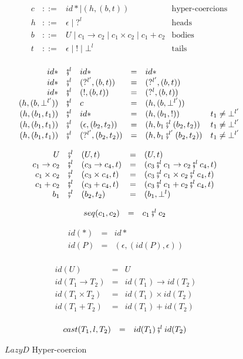 \documentclass[acmsmall,review,anonymous]{acmart}\settopmatter{printfolios=true,printccs=false,printacmref=false}
\newcommand{\stxrule}[3]{#1 & ::= & #3 & \text{#2}\\}
\newcommand{\funrule}[3]{#1 & = & #2 & #3\\}
\newcommand{\comprule}[4]{#1 & \fatsemi^l & #2 & = & #3 & #4 \\}
\newcommand{\plus}[0]{+}
\begin{document}
\begin{figure}
	\[ 
	\begin{array}{lclr}
	\stxrule{c}{hyper-coercions}{
		id* \mid{}
		( h , ( b , t ) )
	}
	\stxrule{h}{heads}{
		\epsilon \mid{}
		?^l
	}
	\stxrule{b}{bodies}{
		U \mid{}
		c_1 \rightarrow c_2 \mid{}
		c_1 \times c_2 \mid{}
		c_1 \plus c_2
	}
	\stxrule{t}{tails}{
		\epsilon \mid{}
		! \mid{}
		\bot^l
	}
	\end{array}
	\]
	
	\[ 
	\begin{array}{rclclr}
	\comprule{id*}{id*}{
		id*
	}{}
	\comprule{id*}{( ?^{l'} , ( b , t ) )}{
		( ?^{l'} , ( b , t ) )
	}{}
	\comprule{id*}{( ! , ( b , t ) )}{
		(?^{l} , ( b , t))
	}{}
	\comprule{(h , (b ,\bot^{l'}))}{c}{
		(h , (b ,\bot^{l'}))
	}{}
	\comprule{(h , (b_1 , t_1))}{id*}{
		(h , (b_1 , !))
	}{t_1 \neq \bot^{l'}}
	\comprule{(h , (b_1 , t_1))}{(\epsilon , (b_2 , t_2))}{
		(h , b_1 \fatsemi^{l} (b_2 , t_2))
	}{t_1 \neq \bot^{l'}}
	\comprule{(h , (b_1 , t_1))}{(?^{l'} , (b_2 , t_2))}{
		(h , b_1 \fatsemi^{l'} (b_2 , t_2))
	}{t_1 \neq \bot^{l'}}
	\end{array}
	\]
	
	\[ 
	\begin{array}{rclclr}
	\comprule{U}{(U,t)}{
		(U,t)
	}{}
	\comprule{c_1 \rightarrow c_2}{(c_3 \rightarrow c_4,t)}{
		(c_3 \fatsemi^{l} c_1 \rightarrow c_2 \fatsemi^l c_4, t)
	}{}
	\comprule{c_1 \times c_2}{(c_3 \times c_4,t)}{
		(c_3 \fatsemi^{l} c_1 \times c_2 \fatsemi^l c_4, t)
	}{}
	\comprule{c_1 \plus c_2}{(c_3 \plus c_4,t)}{
		(c_3 \fatsemi^{l} c_1 \plus c_2 \fatsemi^l c_4, t)
	}{}
	\comprule{b_1}{(b_2,t_2)}{
		(b_1,\bot^l)
	}{}
	\end{array}
	\]
	
	\[
	\begin{array}{rclr}
	\funrule{seq(c_1,c_2)}{
		c_1 \fatsemi^l c_2
	}{}
	\end{array}
	\]
	
	\[
	\begin{array}{rclr}
	\funrule{id(*)}{
		id*
	}{}
	\funrule{id(P)}{
		(\epsilon,(id(P),\epsilon))
	}{}
	\end{array}
	\]
	
	\[
	\begin{array}{rclr}
	\funrule{id(U)}{U}{}
	\funrule{id(T_1 \rightarrow T_2)}{
		id(T_1) \rightarrow id(T_2)
	}{}
	\funrule{id(T_1 \times T_2)}{
		id(T_1) \times id(T_2)
	}{}
	\funrule{id(T_1 \plus T_2)}{
		id(T_1) \plus id(T_2)
	}{}
	\end{array}
	\]
	
	\[
	\begin{array}{rclr}
	\funrule{cast(T_1,l,T_2)}{
		id(T_1) \fatsemi^l id(T_2)
	}{}
	\end{array}
	\]
	

	\caption{$Lazy D$ Hyper-coercion}
	\label{fig:HC-D}
\end{figure}
\end{document}
